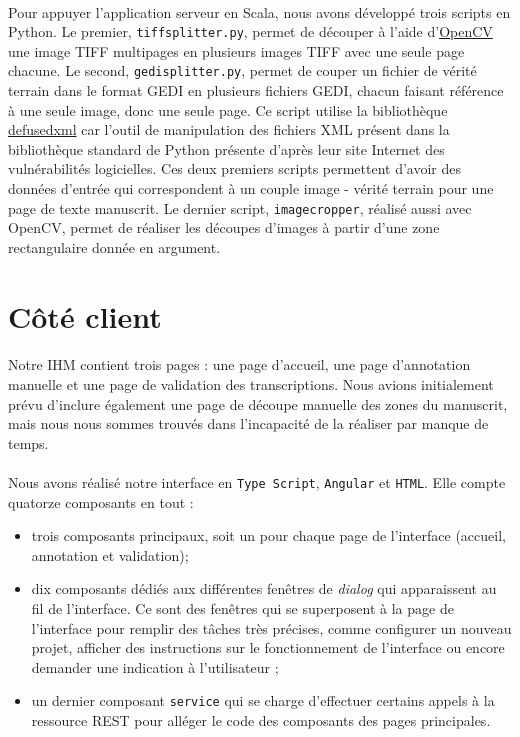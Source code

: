 \paragraph{}
Pour appuyer l'application serveur en Scala, nous avons développé trois scripts en Python. Le premier, \texttt{tiffsplitter.py}, permet de découper à l'aide d'\href{https://opencv.org/}{OpenCV} une image TIFF multipages en plusieurs images TIFF avec une seule page chacune. Le second, \texttt{gedisplitter.py}, permet de couper un fichier de vérité terrain dans le format GEDI en plusieurs fichiers GEDI, chacun faisant référence à une seule image, donc une seule page. Ce script utilise la bibliothèque \href{https://pypi.org/project/defusedxml/}{defusedxml} car l'outil de manipulation des fichiers XML présent dans la bibliothèque standard de Python présente d'après leur site Internet des vulnérabilités logicielles. Ces deux premiers scripts permettent d'avoir des données d'entrée qui correspondent à un couple image - vérité terrain pour une page de texte manuscrit. Le dernier script, \texttt{imagecropper}, réalisé aussi avec OpenCV, permet de réaliser les découpes d'images à partir d'une zone rectangulaire donnée en argument.

\section{Côté client}
\paragraph{}
Notre IHM contient trois pages : une page d'accueil, une page d'annotation manuelle et une page de validation des transcriptions. Nous avions initialement prévu d'inclure également une page de découpe manuelle des zones du manuscrit, mais nous nous sommes trouvés dans l'incapacité de la réaliser par manque de temps.

\paragraph{}
Nous avons réalisé notre interface en \texttt{Type Script}, \texttt{Angular} et \texttt{HTML}. Elle compte quatorze composants en tout :
\begin{itemize}
\item trois composants principaux, soit un pour chaque page de l'interface (accueil, annotation et validation);
\item dix composants dédiés aux différentes fenêtres de \textit{dialog} qui apparaissent au fil de l'interface. Ce sont des fenêtres qui se superposent à la page de l'interface pour remplir des tâches très précises, comme configurer un nouveau projet, afficher des instructions sur le fonctionnement de l'interface ou encore demander une indication à l'utilisateur ;
\item un dernier composant \texttt{service} qui se charge d'effectuer certains appels à la ressource REST pour alléger le code des composants des pages principales.
\end{itemize}

